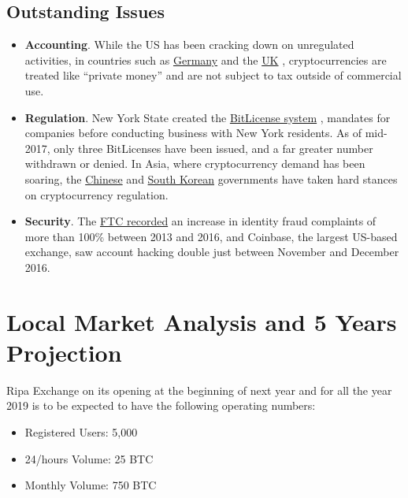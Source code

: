 \documentclass[11pt,fleqn]{book} %
\begin{document}
	\subsection{Outstanding Issues}
		\begin{itemize}
			\item \textbf{Accounting}. While the US has been cracking down on unregulated activities, in countries such as 
			\href{https://techcrunch.com/2013/08/19/germany-recognizes-bitcoin-as-private-money-sales-tax-coming-soon/}{Germany} 
			\cite{techCrunchPrivateMoney}
			and the \href{http://www.ibtimes.co.uk/hmrc-re-classify-bitcoin-private-money-1432718}{UK}
			\cite{ibtimesPrivateMoney}, 
			cryptocurrencies are treated like ``private money'' and are not subject to tax outside of commercial use.
			\item \textbf{Regulation}. New York State created the 
			\href{https://www.wired.com/2014/07/ny_bitcoin/}{BitLicense system} \cite{wiredNYLicense}, mandates for companies 
			before conducting business with New York residents. As of mid-2017, only three BitLicenses have been issued, 
			and a far greater number withdrawn or denied. In Asia, where cryptocurrency demand has been soaring, 
			the \href{http://fortune.com/2018/01/17/china-bitcoin-cryptocurrency-crackdown/}{Chinese} 
			\cite{fortune}
			and \href{https://www.bloomberg.com/news/articles/2017-12-13/south-korea-seeks-measures-to-curb-frenzied-bitcoin-speculation}{South Korean} 
			\cite{bloombergSKBan}
			governments have taken hard stances on cryptocurrency regulation.
			\item \textbf{Security}. The 
			\href{https://www.forbes.com/sites/laurashin/2016/12/20/hackers-have-stolen-millions-of-dollars-in-bitcoin-using-only-phone-numbers/#3ac0bf1d38ba}{FTC recorded} 
			\cite{forbesBitcoinHacking} 
			an increase in identity fraud complaints of more than 100\% between 2013 and 2016, 
			and Coinbase, the largest US-based exchange, saw account hacking double just between November and December 2016.
		\end{itemize}

\section{Local Market Analysis and 5 Years Projection}
Ripa Exchange on its opening at the beginning of next year and for all the year 2019 is to be expected
to have the following operating numbers:
\begin{itemize}
	\item Registered Users: 5,000			%
	\item 24/hours Volume: 25 BTC			%
	\item Monthly Volume: 750 BTC			%
\end{itemize}
\end{document}
